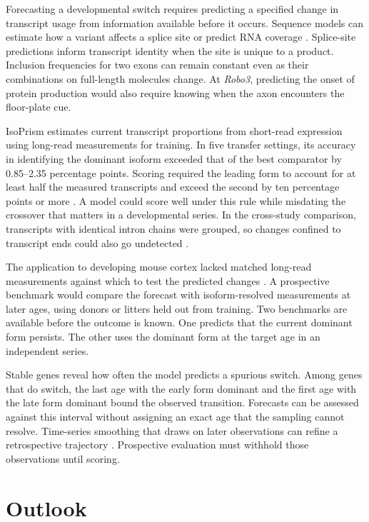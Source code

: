 \documentclass[11pt,a4paper]{article}
\begin{document}
Forecasting a developmental switch requires predicting a specified change in transcript usage from information available before it occurs. Sequence models can estimate how a variant affects a splice site or predict RNA coverage \cite{SpliceAI2019,Pangolin2022,Borzoi2025,AlphaGenome2026}. Splice-site predictions inform transcript identity when the site is unique to a product. Inclusion frequencies for two exons can remain constant even as their combinations on full-length molecules change. At \textit{Robo3}, predicting the onset of protein production would also require knowing when the axon encounters the floor-plate cue.

IsoPrism estimates current transcript proportions from short-read expression using long-read measurements for training. In five transfer settings, its accuracy in identifying the dominant isoform exceeded that of the best comparator by 0.85--2.35 percentage points. Scoring required the leading form to account for at least half the measured transcripts and exceed the second by ten percentage points or more \cite{IsoPrism2026}. A model could score well under this rule while misdating the crossover that matters in a developmental series. In the cross-study comparison, transcripts with identical intron chains were grouped, so changes confined to transcript ends could also go undetected \cite{IsoPrism2026}.

The application to developing mouse cortex lacked matched long-read measurements against which to test the predicted changes \cite{IsoPrism2026}. A prospective benchmark would compare the forecast with isoform-resolved measurements at later ages, using donors or litters held out from training. Two benchmarks are available before the outcome is known. One predicts that the current dominant form persists. The other uses the dominant form at the target age in an independent series.

Stable genes reveal how often the model predicts a spurious switch. Among genes that do switch, the last age with the early form dominant and the first age with the late form dominant bound the observed transition. Forecasts can be assessed against this interval without assigning an exact age that the sampling cannot resolve. Time-series smoothing that draws on later observations can refine a retrospective trajectory \cite{DICEseq2016}. Prospective evaluation must withhold those observations until scoring.

\section{Outlook}
\end{document}
